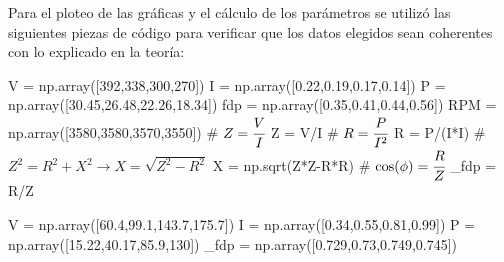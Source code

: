 \documentclass[a4paper,12pt]{article}
\begin{document}
Para el ploteo de las gráficas y el cálculo de los parámetros se utilizó las siguientes piezas de código para verificar que los datos elegidos sean coherentes con lo explicado en la teoría:
\begin{pyglist}[language=python,caption={Prueba de vacío},style=pastie]
V = np.array([392,338,300,270]) 
I = np.array([0.22,0.19,0.17,0.14]) 
P = np.array([30.45,26.48,22.26,18.34]) 
fdp = np.array([0.35,0.41,0.44,0.56]) 
RPM = np.array([3580,3580,3570,3550])
# $Z = \cfrac{V}{I}$
Z = V/I
# $R = \cfrac{P}{I^{2}}$
R = P/(I*I)
# $Z^{2} = R^{2} + X^{2} \longrightarrow X = \sqrt{Z^{2}-R^{2}}$
X = np.sqrt(Z*Z-R*R)
# $\cos\!\,(\phi) = \cfrac{R}{Z}$
_fdp = R/Z
\end{pyglist}

\begin{pyglist}[language=python,caption={Prueba de cortocircuito},style=pastie]
V = np.array([60.4,99.1,143.7,175.7]) 
I = np.array([0.34,0.55,0.81,0.99]) 
P = np.array([15.22,40.17,85.9,130]) 
_fdp = np.array([0.729,0.73,0.749,0.745])
\end{pyglist}
\end{document}
